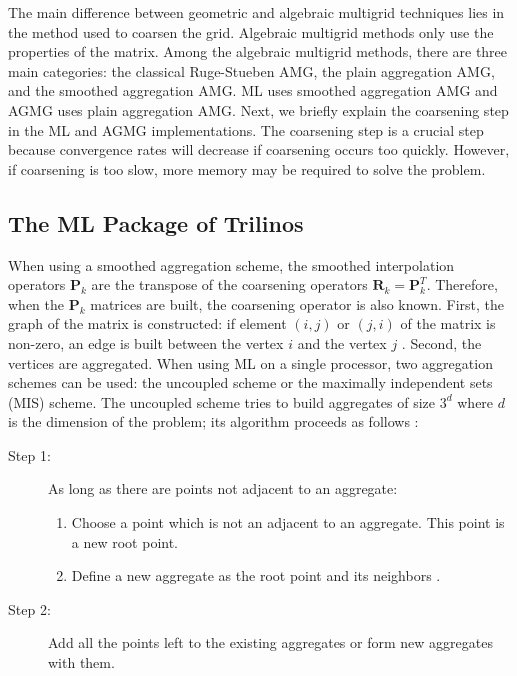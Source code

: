 \documentclass[preprint,10pt]{elsarticle}
\newcommand\bs{\boldsymbol}
\renewcommand{\(}{\left(}
\renewcommand{\)}{\right)}
\renewcommand{\[}{\left[}
\renewcommand{\]}{\right]}
\begin{document}
The main difference between geometric and algebraic multigrid techniques
lies in the method used
to coarsen the grid. Algebraic multigrid methods only use the properties of the
matrix. Among the algebraic multigrid methods, there are three main categories: 
the classical Ruge-Stueben AMG, the plain aggregation AMG, and the
smoothed aggregation AMG. ML uses smoothed aggregation AMG and AGMG
uses plain aggregation AMG. Next, we briefly explain the coarsening step in
the ML and AGMG implementations. The coarsening step is a crucial step 
because convergence rates will decrease if coarsening occurs too quickly. 
However, if coarsening is too slow, more memory may be required to solve the problem. 

\subsection{The ML Package of Trilinos}
When using a smoothed aggregation scheme, the smoothed interpolation operators
$\bs{P}_k$ are the transpose of the coarsening operators
$\bs{R}_k=\bs{P}_k^T$. Therefore, when the $\bs{P}_k$ matrices are built, the
coarsening operator is also known. First, the graph of the matrix is
constructed: if element $(i,j)$ or $(j,i)$ of the matrix is non-zero, an edge
is built between the vertex $i$ and the vertex $j$ \cite{ml_guide}. Second,
the vertices are 
aggregated. When using ML on a single processor, two aggregation schemes can
be used: the uncoupled scheme or the maximally independent sets (MIS) scheme. 
The uncoupled scheme tries to build aggregates of size $3^d$ where $d$ is the
dimension of the problem; its algorithm proceeds as follows \cite{mis}:
\begin{description}
  \item[Step 1:] As long as there are points not adjacent to an aggregate:
    \begin{enumerate}
      \item Choose a point which is not an adjacent to an
        aggregate. This point is a new root point.
      \item Define a new aggregate as the root point and its neighbors .
    \end{enumerate}
  \item[Step 2:] Add all the points left to the existing aggregates or form 
    new aggregates with them.
\end{description}
\end{document}
